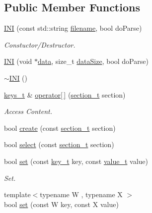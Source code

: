 \subsection*{Public Member Functions}
\begin{DoxyCompactItemize}
\item 
\hyperlink{class_i_n_i_a5dcc2ba1277bf200bd2e60278640db52}{I\+N\+I} (const std\+::string \hyperlink{class_i_n_i_af52e483d586ea3416df114e70755e96c}{filename}, bool do\+Parse)
\begin{DoxyCompactList}\small\item\em Constuctor/\+Destructor. \end{DoxyCompactList}\item 
\hyperlink{class_i_n_i_ad94b2a2f7fb2636bb67afa1bbad7e961}{I\+N\+I} (void $\ast$\hyperlink{class_i_n_i_a3a7884bd145b42e76290f22711536668}{data}, size\+\_\+t \hyperlink{class_i_n_i_a602d6b20ea275f3e654f1508a95ceea6}{data\+Size}, bool do\+Parse)
\item 
\hyperlink{class_i_n_i_aa4bd1dbe434aaadf429a5ddfd26d25f8}{$\sim$\+I\+N\+I} ()
\item 
\hyperlink{class_i_n_i_a4254e881abdbf891a408cb032e0d717d}{keys\+\_\+t} \& \hyperlink{class_i_n_i_abac006fb18cd3c8a12815ec8850006b5}{operator\mbox{[}$\,$\mbox{]}} (\hyperlink{class_i_n_i_a82551bff97cdd5c7ff183b24bd9b2188}{section\+\_\+t} section)
\begin{DoxyCompactList}\small\item\em Access Content. \end{DoxyCompactList}\item 
bool \hyperlink{class_i_n_i_a946c00af4146190918b479cfe849bb88}{create} (const \hyperlink{class_i_n_i_a82551bff97cdd5c7ff183b24bd9b2188}{section\+\_\+t} section)
\item 
bool \hyperlink{class_i_n_i_a6132ce549f8fa43ecb4faf5c5fd6dbf0}{select} (const \hyperlink{class_i_n_i_a82551bff97cdd5c7ff183b24bd9b2188}{section\+\_\+t} section)
\item 
bool \hyperlink{class_i_n_i_a60aea0868d612b12941b53304bb2d8f3}{set} (const \hyperlink{class_i_n_i_acfa659efbac1eb0c62c1a910b0b09541}{key\+\_\+t} key, const \hyperlink{class_i_n_i_aeda858880798b4d54ba09bbd00ee1683}{value\+\_\+t} value)
\begin{DoxyCompactList}\small\item\em Set. \end{DoxyCompactList}\item 
{\footnotesize template$<$typename W , typename X $>$ }\\bool \hyperlink{class_i_n_i_aa1dd6129122078d11d4e59198c303ffb}{set} (const W key, const X value)

\end{DoxyCompactItemize}
